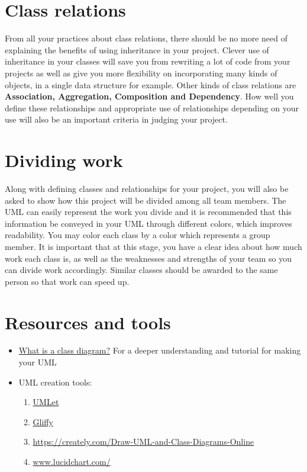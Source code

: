 \documentclass[11pt,fleqn]{book} %
\begin{document}
    \section{Class relations}
    From all your practices about class relations, there should be no more need of explaining the benefits of using inheritance in your project. Clever use of inheritance in your classes will save you from rewriting a lot of code from your projects as well as give you more flexibility on incorporating many kinds of objects, in a single data structure for example. Other kinds of class relations are \textbf{Association, Aggregation, Composition and Dependency}. How well you define these relationships and appropriate use of relationships depending on your use will also be an important criteria in judging your project.
    \section{Dividing work}
    Along with defining classes and relationships for your project, you will also be asked to show how this project will be divided among all team members. The UML can easily represent the work you divide and it is recommended that this information be conveyed in your UML through different colors, which improves readability. You may color each class by a color which represents a group member. It is important that at this stage, you have a clear idea about how much work each class is, as well as the weaknesses and strengths of your team so you can divide work accordingly. Similar classes should be awarded to the same person so that work can speed up.
    
    
    \section{Resources and tools}
    \begin{itemize}
     \item \color{blue} \href{https://www.visual-paradigm.com/guide/uml-unified-modeling-language/what-is-class-diagram/}{What is a class diagram?} \color{black} For a deeper understanding and tutorial for making your UML
     \item \color{black} UML creation tools:
     \begin{enumerate}
     \item \color{blue} \href{http://www.umlet.com/}{UMLet} \color{black}
     \item \color{blue} \href{https://www.gliffy.com/examples/uml-diagrams}{Gliffy} \color{black}
     \item \color{blue} \href{https://creately.com/Draw-UML-and-Class-Diagrams-Online}{https://creately.com/Draw-UML-and-Class-Diagrams-Online} \color{black}
     \item \color{blue} \href{www.lucidchart.com/}{www.lucidchart.com/} \color{black}
     \end{enumerate}
  
    \end{itemize}
     
\end{document}
